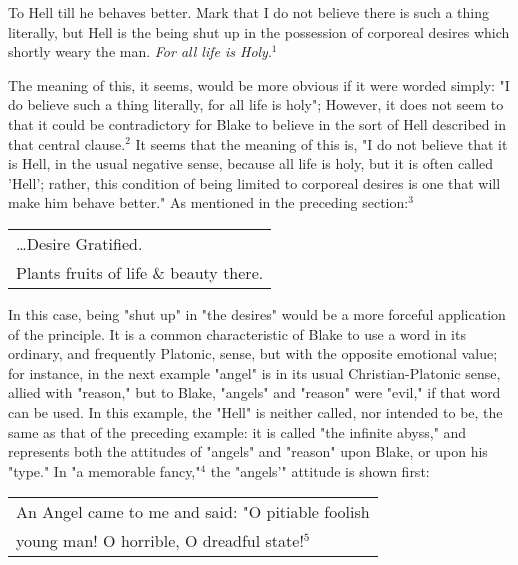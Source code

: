 \begin{center}
	\parbox{0.8\textwidth}{
		\hspace*{5mm}To Hell till he behaves better. Mark that I do not believe there is such
		a thing literally, but Hell is the being shut up in the possession of corporeal
		desires which shortly weary the man. \textit{For all life is Holy}.$^{1}$\par
	}%
\end{center}
\hspace*{5mm}The meaning of this, it seems, would be more obvious if it were worded simply:
"I do believe such a thing literally, for all life is holy";
However, it does not seem to that it could be contradictory for Blake to believe in the sort of
Hell described in that central clause.$^{2}$ It seems that the meaning of this is, "I do not believe
that it is Hell, in the usual negative sense, because all life is holy, but it is often called 'Hell'; rather,
this condition of being limited to corporeal desires is one that will make him behave better." As mentioned in the
preceding section:$^{3}$\par
\begin{center}
	\parbox{0.8\textwidth}{
		\centering
		\begin{tabular}{l}
			\dots Desire Gratified. \\
			Plants fruits of life \& beauty there.
		\end{tabular}
	}%
\end{center}
\hspace*{5mm}In this case, being "shut up" in "the desires" would be a more forceful application of the principle. It is a
common characteristic of Blake to use a word in its ordinary, and frequently Platonic, sense, but with the opposite
emotional value; for instance, in the next example "angel" is in its
usual Christian-Platonic sense, allied with "reason," but to Blake, "angels" and "reason" were "evil," if that word can
be used. In this example, the "Hell" is neither called, nor intended to be, the same as that of the preceding example:
it is called "the infinite abyss," and represents both the attitudes of "angels" and "reason" upon Blake, or
upon his "type." In "a memorable fancy,"$^{4}$ the "angels'" attitude is shown first:\par
\begin{center}
	\parbox{0.8\textwidth}{
		\centering
		\begin{tabular}{l}
			An Angel came to me and said: "O pitiable foolish \\
			young man! O horrible, O dreadful state!$^{5}$
		\end{tabular}
	}%
\end{center}
